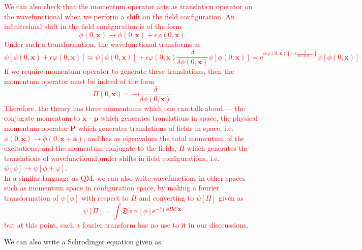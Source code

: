 \documentclass[11pt]{article}
\newcommand{\e}{\mathrm{e}}
\newcommand{\D}{\mathfrak{D}}
\numberwithin{equation}{section}
\begin{document}
    \textcolor{red}{
        We can also check that the momentum operator acts as translation operator on the wavefunctional when we perform a shift on the field configuration. An infinitesimal shift in the field configuration is of the form 
        \begin{equation}
            \phi(0, \textbf{x}) \to \phi(0, \textbf{x}) + \epsilon \varphi(0, \textbf{x})
        \end{equation}
        Under such a transformation, the wavefunctional transforms as 
        \begin{equation}
            \psi[\phi(0, \textbf{x}) + \epsilon \varphi(0, \textbf{x})] \approx \psi[\phi(0, \textbf{x})] + \epsilon \varphi(0, \textbf{x})\frac{\delta }{\delta  \phi(0, \textbf{x})}\psi[\phi(0, \textbf{x})] = \e^{i\epsilon\varphi(0, \textbf{x}) \left( -i\frac{\delta}{\delta \phi(0, \textbf{x})} \right)}\psi[\phi(0, \textbf{x})]
        \end{equation}
        If we require momentum operator to generate these translations, then the momentum operator must be indeed of the form 
        \begin{equation}
            \Pi(0, \textbf{x}) = -i\frac{\delta}{\delta \phi(0, \textbf{x})}
        \end{equation}
        Therefore, the theory has three momentums which one can talk about — the conjugate momentum to \(\textbf{x}\) - \(\textbf{p}\) which generates translations in space, the physical momentum operator \(\textbf{P}\) which generates translations of fields in space, i.e. \(\phi(0, \textbf{x}) \to \phi(0, \textbf{x} + \textbf{a})\), and has as eigenvalues the total momentum of the excitations, and the momentum conjugate to the fields, \(\Pi\) which generates the translations of wavefunctional under shifts in field configurations, i.e. \(\psi[\phi] \to \psi[\phi + \varphi]\).\\
        In a similar language as QM, we can also write wavefunctions in other spaces such as momentum space in configuration space, by making a fourier transformation of \(\psi[\phi]\) with respect to \(\Pi\) and converting to \(\psi[\Pi]\) given as 
        \begin{equation}
            \psi[\Pi] = \int \D \phi ~\psi[\phi] \e^{-i\int \phi \Pi d^3\textbf{x}}
        \end{equation}
        but at this point, such a fourier transform has no use to it in our disccussions.\\
    }

    We can also write a Schrodinger equation given as 
\end{document}
